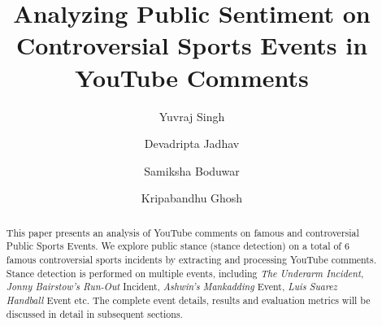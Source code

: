 \documentclass[sigconf, review]{acmart}
\begin{document}
\title{Analyzing Public Sentiment on Controversial Sports Events in YouTube Comments}

\author{Yuvraj Singh}


\author{Devadripta Jadhav}

\author{Samiksha Boduwar}




\author{Kripabandhu Ghosh}

\renewcommand{\shortauthors}{Yuvraj et al.}

\begin{abstract}
  This paper presents an analysis of YouTube comments on famous and controversial Public Sports Events. We explore public stance (stance detection) on a total of 6 famous controversial sports incidents by extracting and processing YouTube comments. Stance detection is performed on multiple events, including \textit{The Underarm Incident}, \textit{Jonny Bairstow's Run-Out} Incident, \textit{Ashwin's Mankadding} Event, \textit{Luis Suarez Handball} Event etc. 
The complete event details,  results and evaluation metrics will be discussed in detail in subsequent sections.
\end{abstract}
\end{document}
